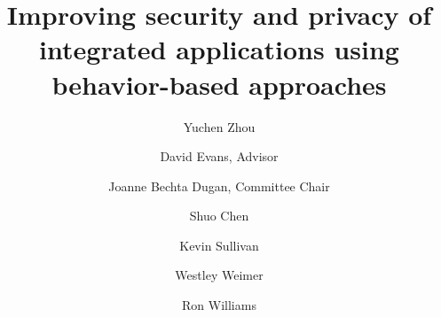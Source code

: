 \documentclass[10pt,letterpaper,openany]{book}
\author{Yuchen Zhou}
\title{Improving security and privacy of integrated applications using behavior-based approaches}
\begin{document}
\maketitle
\copyrightpage
\frontmatter

\begin{signatures}
\signature[David Evans]{David Evans, Advisor}
\signature[Joanne Bechta Dugan]{Joanne Bechta Dugan, Committee Chair}
\signature[Shuo Chen]{Shuo Chen}
\signature[Kevin Sullivan]{Kevin Sullivan}
\signature[Westley Weimer]{Westley Weimer}
\signature[Ron Williams]{Ron Williams}
\end{signatures}
\dedication{To everyone who's helped me succeed}

\tableofcontents
\listoftables
\listoffigures
\mainmatter







\backmatter

\end{document}
